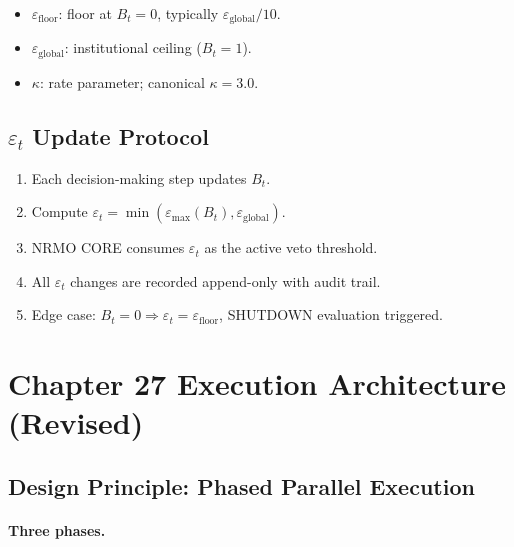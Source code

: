 \begin{itemize}
\item $\varepsilon_{\mathrm{floor}}$: floor at $B_t = 0$,
typically $\varepsilon_{\mathrm{global}} / 10$.
\item $\varepsilon_{\mathrm{global}}$: institutional ceiling
($B_t = 1$).
\item $\kappa$: rate parameter; canonical $\kappa = 3.0$.
\end{itemize}

\subsection{$\varepsilon_t$ Update Protocol}

\begin{enumerate}
\item Each decision-making step updates $B_t$.
\item Compute $\varepsilon_t = \min(\varepsilon_{\max}(B_t),
\varepsilon_{\mathrm{global}})$.
\item NRMO CORE consumes $\varepsilon_t$ as the active veto
threshold.
\item All $\varepsilon_t$ changes are recorded append-only with
audit trail.
\item Edge case: $B_t = 0 \Rightarrow \varepsilon_t =
\varepsilon_{\mathrm{floor}}$, SHUTDOWN evaluation triggered.
\end{enumerate}

\section{Chapter 27 Execution Architecture (Revised)}
\label{sec:r1fix-execution-architecture}

\subsection{Design Principle: Phased Parallel Execution}


\paragraph{Three phases.}

